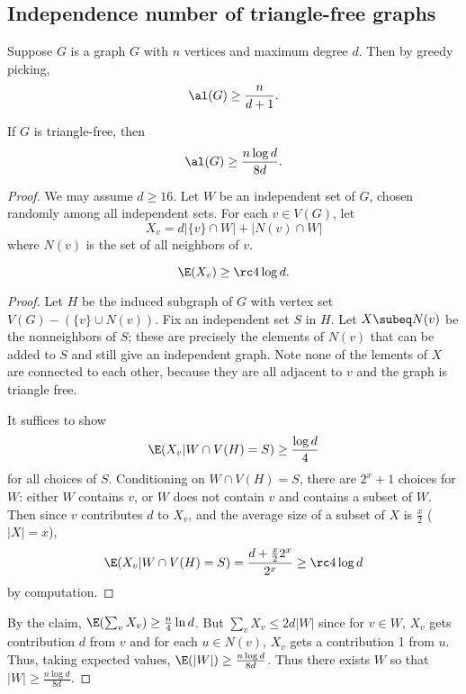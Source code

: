 
\subsection{Independence number of triangle-free graphs}
Suppose $G$ is a graph $G$ with $n$ vertices and maximum degree $d$. Then by greedy picking,
\[
\al(G)\ge \frac{n}{d+1}.
\]
\begin{thm}
If $G$ is triangle-free, then
\[
\al(G)\ge \frac{n\log d}{8d}.
\]
\end{thm}
\begin{proof}
We may assume $d\ge 16$. Let $W$ be an independent set of $G$, chosen randomly among all independent sets. For each $v\in V(G)$, let
\[
X_v=d|\{v\}\cap W|+|N(v)\cap W|
\]
where $N(v)$ is the set of all neighbors of $v$.
\begin{clm}
\[
\E(X_v)\ge \rc 4\log d.
\]
\end{clm}
\begin{proof}
Let $H$ be the induced subgraph of $G$ with vertex set $V(G)-(\{v\} \cup N(v))$. Fix an independent set $S$ in $H$. Let $X\subeq N(v)$ be the nonneighbors of $S$; these are precisely the elements of $N(v)$ that can be added to $S$ and still give an independent graph. Note none of the lements of $X$ are connected to each other, because they are all adjacent to $v$ and the graph is triangle free.

It suffices to show 
\[
\E(X_v|W\cap V(H)=S)\ge \frac{\log d}{4}
\]
for all choices of $S$. Conditioning on $W\cap V(H)=S$, there are $2^x+1$ choices for $W$: either $W$ contains $v$, or $W$ does not contain $v$ and contains a subset of $W$. Then since $v$ contributes $d$ to $X_v$, and the average size of a subset of $X$ is $\frac x2$ ($|X|=x$),
\[
\E(X_v|W\cap V(H)=S)=\frac{d+\frac x22^x}{2^x}\ge \rc 4 \log d
\]
by computation.
\end{proof}
By the claim, $\E(\sum_v X_v)\ge \frac n4\ln d$. But $\sum_v X_v\le 2d|W|$ since for $v\in W$, $X_v$ gets contribution $d$ from $v$ and for each $u\in N(v)$, $X_v$ gets a contribution 1 from $u$. Thus, taking expected values, $\E(|W|)\ge \frac{n\log d}{8d}$. Thus there exists $W$ so that $|W|\ge \frac{n\log d}{8d}$.
\end{proof}
